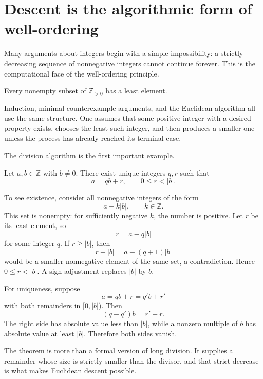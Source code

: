 
\section{Descent is the algorithmic form of well-ordering}

Many arguments about integers begin with a simple impossibility: a strictly decreasing sequence of nonnegative integers cannot continue forever.  This is the computational face of the well-ordering principle.

\begin{theorem}
Every nonempty subset of \(\mathbb Z_{>0}\) has a least element.
\end{theorem}

Induction, minimal-counterexample arguments, and the Euclidean algorithm all use the same structure.  One assumes that some positive integer with a desired property exists, chooses the least such integer, and then produces a smaller one unless the process has already reached its terminal case.

The division algorithm is the first important example.

\begin{theorem}
Let \(a,b\in\mathbb Z\) with \(b\ne0\).  There exist unique integers \(q,r\) such that
\[
  a=qb+r,
  \qquad
  0\le r<|b|.
\]
\end{theorem}

To see existence, consider all nonnegative integers of the form
\[
  a-k|b|,
  \qquad k\in\mathbb Z.
\]
This set is nonempty: for sufficiently negative \(k\), the number is positive.  Let \(r\) be its least element, so
\[
  r=a-q|b|
\]
for some integer \(q\).  If \(r\ge |b|\), then
\[
  r-|b|=a-(q+1)|b|
\]
would be a smaller nonnegative element of the same set, a contradiction.  Hence \(0\le r<|b|\).  A sign adjustment replaces \(|b|\) by \(b\).

For uniqueness, suppose
\[
  a=qb+r=q'b+r'
\]
with both remainders in \([0,|b|)\).  Then
\[
  (q-q')b=r'-r.
\]
The right side has absolute value less than \(|b|\), while a nonzero multiple of \(b\) has absolute value at least \(|b|\).  Therefore both sides vanish.

The theorem is more than a formal version of long division.  It supplies a remainder whose size is strictly smaller than the divisor, and that strict decrease is what makes Euclidean descent possible.

